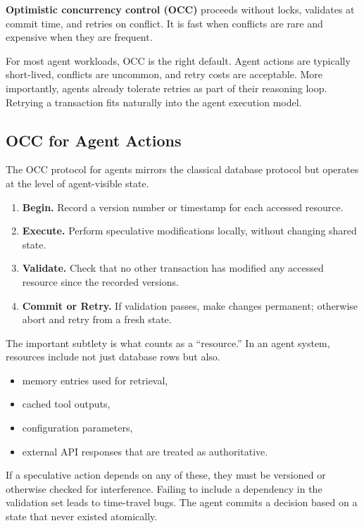\textbf{Optimistic concurrency control (OCC)} proceeds without locks, validates at commit time, and retries on conflict. It is fast when conflicts are rare and expensive when they are frequent.

For most agent workloads, OCC is the right default. Agent actions are typically short-lived, conflicts are uncommon, and retry costs are acceptable. More importantly, agents already tolerate retries as part of their reasoning loop. Retrying a transaction fits naturally into the agent execution model.

\subsection{OCC for Agent Actions}

The OCC protocol for agents mirrors the classical database protocol but operates at the level of agent-visible state.

\begin{enumerate}
\item \textbf{Begin.} Record a version number or timestamp for each accessed resource.
\item \textbf{Execute.} Perform speculative modifications locally, without changing shared state.
\item \textbf{Validate.} Check that no other transaction has modified any accessed resource since the recorded versions.
\item \textbf{Commit or Retry.} If validation passes, make changes permanent; otherwise abort and retry from a fresh state.
\end{enumerate}

The important subtlety is what counts as a ``resource.'' In an agent system, resources include not just database rows but also.
\begin{itemize}
\item memory entries used for retrieval,
\item cached tool outputs,
\item configuration parameters,
\item external API responses that are treated as authoritative.
\end{itemize}

If a speculative action depends on any of these, they must be versioned or otherwise checked for interference. Failing to include a dependency in the validation set leads to time-travel bugs. The agent commits a decision based on a state that never existed atomically.

